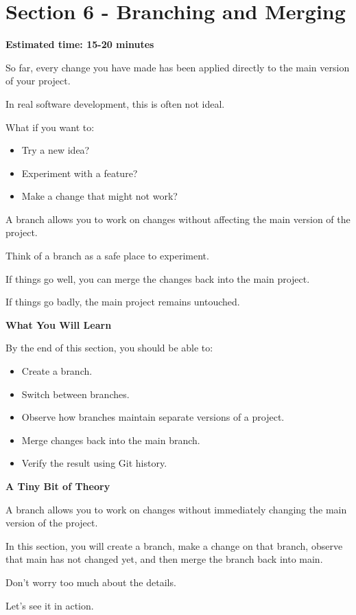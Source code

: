 \documentclass{csc2059practical}
\begin{document}
\clearpage
\section{Section 6 - Branching and Merging}
\begin{infobox}
\textbf{Estimated time: 15-20 minutes}
\end{infobox}
So far, every change you have made has been applied directly to the main version of your project.

In real software development, this is often not ideal.

What if you want to:

\begin{itemize}
  \item Try a new idea?
  \item Experiment with a feature?
  \item Make a change that might not work?
\end{itemize}
A branch allows you to work on changes without affecting the main version of the project.

Think of a branch as a safe place to experiment.

If things go well, you can merge the changes back into the main project.

If things go badly, the main project remains untouched.

\begin{learningoutcomes}
\textbf{What You Will Learn}\par
\medskip
By the end of this section, you should be able to:

\begin{itemize}
  \item Create a branch.
  \item Switch between branches.
  \item Observe how branches maintain separate versions of a project.
  \item Merge changes back into the main branch.
  \item Verify the result using Git history.
\end{itemize}
\textbf{A Tiny Bit of Theory}

A branch allows you to work on changes without immediately changing the main version of the project.

In this section, you will create a branch, make a change on that branch, observe that main has not changed yet, and then merge the branch back into main.

Don't worry too much about the details.

Let's see it in action.

\end{learningoutcomes}
\end{document}
